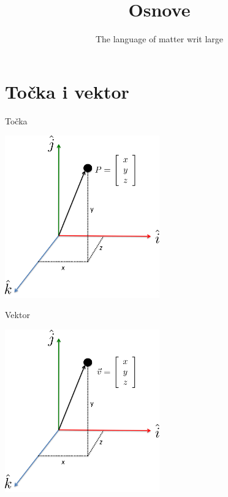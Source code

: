 \documentclass[9pt]{beamer}
\title{Osnove}
\subtitle{The language of matter writ large}
\institute{Računalna grafika}
\begin{document}
\begin{frame}
 \titlepage
\end{frame}

\section{Točka i vektor}
\begin{frame}{Točka}
	\begin{center}
		\includegraphics[height=7cm]{./slike/linear_algebra_a_point.png}
	\end{center}
\end{frame}
\begin{frame}{Vektor}
	\begin{center}
		\includegraphics[height=7cm]{./slike/linear_algebra_a_vector.png}
	\end{center}
\end{frame}
\end{document}
